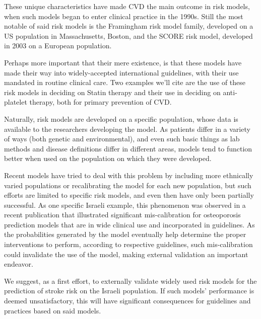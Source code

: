 \documentclass[a4paper,12pt]{article}
\begin{document}
	These unique characteristics have made CVD the main outcome in risk models, when such models began to enter clinical practice in the 1990s\cite{Wilson1998,NationalCholesterolEducationProgramNCEPExpertPanelonDetection2002,Conroy2003,Hippisley-Cox2007,DAgostino2008,Hippisley-Cox2008,Goff2014}. Still the most notable of said risk models is the Framingham risk model family, developed on a US population in Massachusetts, Boston\cite{Wilson1998}, and the SCORE risk model, developed in 2003 on a European population\cite{Conroy2003}.
	
	Perhaps more important that their mere existence, is that these models have made their way into widely-accepted international guidelines, with their use mandated in routine clinical care. Two examples we'll cite are the use of these risk models in deciding on Statin therapy\cite{Goff2014} and their use in deciding on anti-platelet therapy\cite{Bibbins-Domingo2016}, both for primary prevention of CVD.
	
	Naturally, risk models are developed on a specific population, whose data is available to the researchers developing the model. As patients differ in a variety of ways (both genetic and environmental), and even such basic things as lab methods and disease definitions differ in different areas, models tend to function better when used on the population on which they were developed\cite{DAgostino2001,Bastuji-Garin2002}.
	
	Recent models have tried to deal with this problem by including more ethnically varied populations\cite{DeFilippis2015} or recalibrating the model for each new population\cite{Kanis2008}, but such efforts are limited to specific risk models, and even then have only been partially successful\cite{Dagan2017}. As one specific Israeli example, this phenomenon was observed in a recent publication that illustrated significant mis-calibration for osteoporosis prediction models that are in wide clinical use and incorporated in guidelines\cite{Dagan2017}. As the probabilities generated by the model eventually help determine the proper interventions to perform, according to respective guidelines, such mis-calibration could invalidate the use of the model, making external validation an important endeavor\cite{Moons2012}.
	
	We suggest, as a first effort, to externally validate widely used risk models for the prediction of stroke risk on the Israeli population. If such models' performance is deemed unsatisfactory, this will have significant consequences for guidelines and practices based on said models.
	
\end{document}

